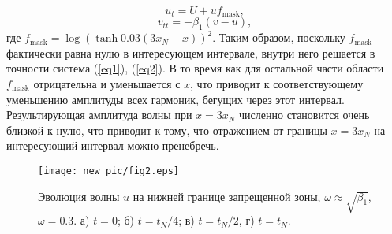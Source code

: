 $$
u_{t}=U + u f_{\text{mask}},
$$
$$
v_{tt}=-\beta_1 (v-u),
$$
где $ f_{\text {mask}} = \log \left(\tanh {0.03 (3 x_N - x)} \right) ^ 2 $. Таким образом, поскольку $ f_{\text{mask}} $ фактически равна нулю в интересующем интервале, внутри него решается в точности система (\ref{eq1}), (\ref{eq2}). В то время как для остальной части области $ f_{\text{mask}} $ отрицательна и уменьшается с $ x $, что приводит к соответствующему уменьшению амплитуды всех гармоник, бегущих через этот интервал. Результирующая амплитуда волны при $ x = 3 x_N $ численно становится очень близкой к нулю, что приводит к тому, что отражением от границы $ x = 3 x_N $ на интересующий интервал можно пренебречь.
\begin{figure*}
\begin{center}
\texttt{[image: new\_pic/fig2.eps]}
\caption{Эволюция волны $ u $ на нижней границе запрещенной зоны, $ \omega \approx \sqrt {\beta_1} $, $\omega = 0.3$. а) $ t = 0 $; б) $ t = t_N / 4 $; в) $ t = t_N / 2 $, г) $ t = t_N $.}
\label{fg2}
\end{center}
\end{figure*}

